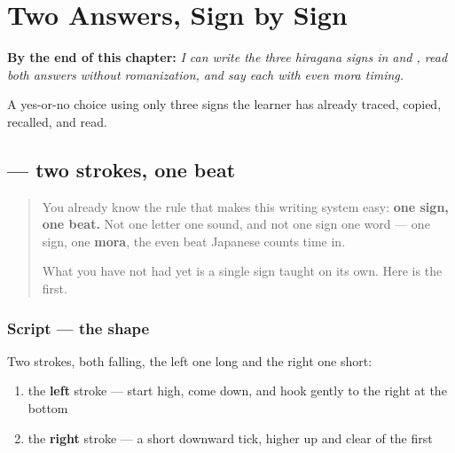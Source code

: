 
\chapter{Two Answers, Sign by Sign}
\label{ch:ja-two-answers}

\begin{chapteropening}
\textbf{By the end of this chapter:} \emph{I can write the three hiragana signs in  and , read both answers without romanization, and say each with even mora timing.}

A yes-or-no choice using only three signs the learner has already traced, copied, recalled, and read.
\end{chapteropening}

\section[\texorpdfstring{\ja{い} (i)}{い (i)}]{ — two strokes, one beat}

\label{lesson:JA-W01-i}



\begin{quote}
You already know the rule that makes this writing system easy: \textbf{one sign, one beat.} Not one letter one sound, and not one sign one word — one sign, one \textbf{mora}, the even beat Japanese counts time in.

What you have not had yet is a single sign taught on its own. Here is the first.
\end{quote}

\subsection*{Script — the shape}

\begin{quote}
\end{quote}

Two strokes, both falling, the left one long and the right one short:

\begin{enumerate}
\raggedright
  \item the \textbf{left} stroke — start high, come down, and hook gently to the right at the bottom
  \item the \textbf{right} stroke — a short downward tick, higher up and clear of the first
\end{enumerate}

